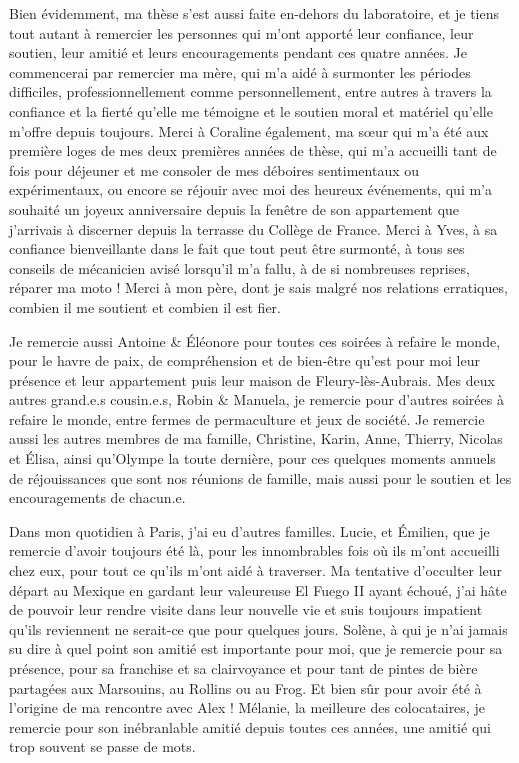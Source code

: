 %
%
%
%
%
\bigskip
Bien évidemment, ma thèse s'est aussi faite en-dehors du laboratoire, et je tiens tout autant à remercier les personnes qui m'ont apporté leur confiance, leur soutien, leur amitié et leurs encouragements pendant ces quatre années.
Je commencerai par remercier ma mère, qui m'a aidé à surmonter les périodes difficiles, professionnellement comme personnellement, entre autres à travers la confiance et la fierté qu'elle me témoigne et le soutien moral et matériel qu'elle m'offre depuis toujours.
Merci à Coraline également, ma  s\oe ur qui m'a été aux première loges de mes deux premières années de thèse, qui m'a accueilli tant de fois pour déjeuner et me consoler de mes déboires sentimentaux ou expérimentaux, ou encore se réjouir avec moi des heureux événements, qui m'a souhaité un joyeux anniversaire depuis la fenêtre de son appartement que j'arrivais à discerner depuis la terrasse du Collège de France.
Merci à Yves, à sa confiance bienveillante dans le fait que tout peut être surmonté, à tous ses conseils de mécanicien avisé lorsqu'il m'a fallu, à de si nombreuses reprises, réparer ma moto !
Merci à mon père, dont je sais malgré nos relations erratiques, combien il me soutient et combien il est fier.

\bigskip
Je remercie aussi Antoine \& Éléonore pour toutes ces soirées à refaire le monde, pour le havre de paix, de compréhension et de bien-être qu'est pour moi leur présence et leur appartement puis leur maison de Fleury-lès-Aubrais.
Mes deux autres grand.e.s cousin.e.s, Robin \& Manuela, je remercie pour d'autres soirées à refaire le monde, entre fermes de permaculture et jeux de société.
Je remercie aussi les autres membres de ma famille, Christine, Karin, Anne, Thierry, Nicolas et Élisa, ainsi qu'Olympe la toute dernière, pour ces quelques moments annuels de réjouissances que sont nos réunions de famille, mais aussi pour le soutien et les encouragements de chacun.e.

\bigskip
Dans mon quotidien à Paris, j'ai eu d'autres familles.
Lucie, et Émilien, que je remercie d'avoir toujours été là, pour les innombrables fois où ils m'ont accueilli chez eux, pour tout ce qu'ils m'ont aidé à traverser.
Ma tentative d'occulter leur départ au Mexique en gardant leur valeureuse \og El Fuego II \fg{} ayant échoué, j'ai hâte de pouvoir leur rendre visite dans leur nouvelle vie et suis toujours impatient qu'ils reviennent ne serait-ce que pour quelques jours.
Solène, à qui je n'ai jamais su dire à quel point son amitié est importante pour moi, que je remercie pour sa présence, pour sa franchise et sa clairvoyance et pour tant de pintes de bière partagées aux Marsouins, au Rollins ou au Frog.
Et bien sûr pour avoir été à l'origine de ma rencontre avec Alex !
Mélanie, la meilleure des colocataires, je remercie pour son inébranlable amitié depuis toutes ces années, une amitié qui trop souvent se passe de mots.

